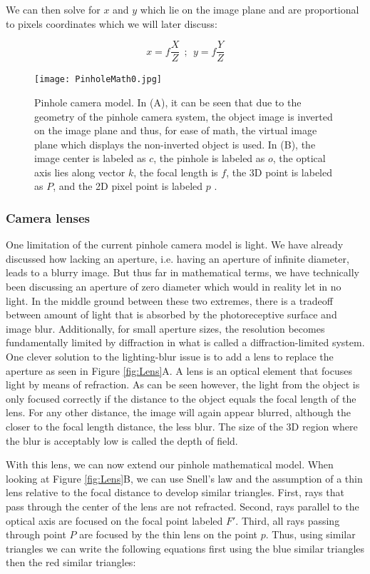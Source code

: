 \begin{itemize}
We can then solve for $x$ and $y$ which lie on the image plane and are proportional to pixels coordinates which we will later discuss:

$$x=f\frac{X}{Z} \ \ ; \ \ y=f\frac{Y}{Z}$$

\begin{figure}
\centering
\texttt{[image: PinholeMath0.jpg]}
\caption{Pinhole camera model. In (A), it can be seen that due to the geometry of the pinhole camera system, the object image is inverted on the image plane and thus, for ease of math, the virtual image plane which displays the non-inverted object is used. In (B), the image center is labeled as $c$, the pinhole is labeled as $o$, the optical axis lies along vector $k$, the focal length is $f$, the 3D point is labeled as $P$, and the 2D pixel point is labeled $p$  \cite{HZ}.}
\label{fig:PinholeMath}
\end{figure}

\subsubsection{Camera lenses}

One limitation of the current pinhole camera model is light. We have already discussed how lacking an aperture, i.e. having an aperture of infinite diameter, leads to a blurry image. But thus far in mathematical terms, we have technically been discussing an aperture of zero diameter which would in reality let in no light. In the middle ground between these two extremes, there is a tradeoff between amount of light that is absorbed by the photoreceptive surface and image blur. Additionally, for small aperture sizes, the resolution becomes fundamentally limited by diffraction in what is called a diffraction-limited system. One clever solution to the lighting-blur issue is to add a lens to replace the aperture as seen in Figure \ref{fig:Lens}A. A lens is an optical element that focuses light by means of refraction. As can be seen however, the light from the object is only focused correctly if the distance to the object equals the focal length of the lens. For any other distance, the image will again appear blurred, although the closer to the focal length distance, the less blur. The size of the 3D region where the blur is acceptably low is called the depth of field.

With this lens, we can now extend our pinhole mathematical model. When looking at Figure \ref{fig:Lens}B, we can use Snell's law and the assumption of a thin lens relative to the focal distance to develop similar triangles. First, rays that pass through the center of the lens are not refracted. Second, rays parallel to the optical axis are focused on the focal point labeled $F'$. Third, all rays passing through point $P$ are focused by the thin lens on the point $p$. Thus, using similar triangles we can write the following equations first using the blue similar triangles then the red similar triangles:


\end{itemize}
